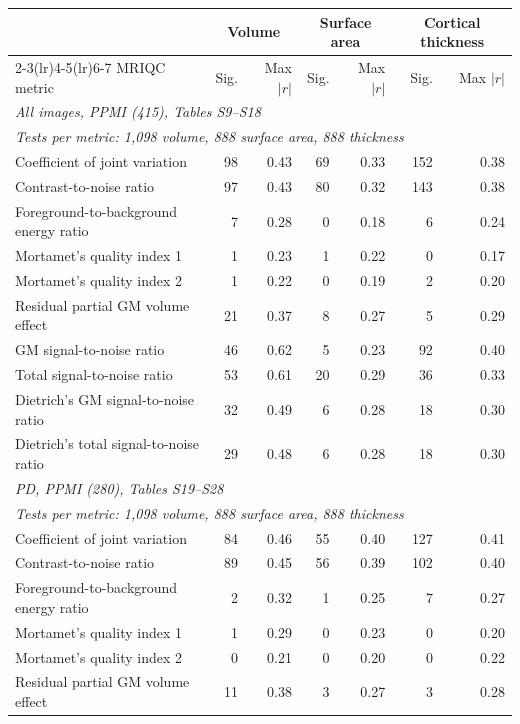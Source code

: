 \begin{tabular}{lrrrrrr}
\toprule
 & \multicolumn{2}{c}{Volume} & \multicolumn{2}{c}{Surface area} & \multicolumn{2}{c}{Cortical thickness} \\
\cmidrule(lr){2-3}\cmidrule(lr){4-5}\cmidrule(lr){6-7}
MRIQC metric & Sig. & Max $|r|$ & Sig. & Max $|r|$ & Sig. & Max $|r|$ \\
\midrule
\multicolumn{7}{l}{\textit{All images{,} PPMI (415){,} Tables S9--S18}} \\
\multicolumn{7}{l}{\textit{Tests per metric: 1{,}098 volume{,} 888 surface area{,} 888 thickness}} \\
Coefficient of joint variation & 98 & 0.43 & 69 & 0.33 & 152 & 0.38 \\
Contrast-to-noise ratio & 97 & 0.43 & 80 & 0.32 & 143 & 0.38 \\
Foreground-to-background energy ratio & 7 & 0.28 & 0 & 0.18 & 6 & 0.24 \\
Mortamet's quality index 1 & 1 & 0.23 & 1 & 0.22 & 0 & 0.17 \\
Mortamet's quality index 2 & 1 & 0.22 & 0 & 0.19 & 2 & 0.20 \\
Residual partial GM volume effect & 21 & 0.37 & 8 & 0.27 & 5 & 0.29 \\
GM signal-to-noise ratio & 46 & 0.62 & 5 & 0.23 & 92 & 0.40 \\
Total signal-to-noise ratio & 53 & 0.61 & 20 & 0.29 & 36 & 0.33 \\
Dietrich's GM signal-to-noise ratio & 32 & 0.49 & 6 & 0.28 & 18 & 0.30 \\
Dietrich's total signal-to-noise ratio & 29 & 0.48 & 6 & 0.28 & 18 & 0.30 \\
\midrule
\multicolumn{7}{l}{\textit{PD{,} PPMI (280){,} Tables S19--S28}} \\
\multicolumn{7}{l}{\textit{Tests per metric: 1{,}098 volume{,} 888 surface area{,} 888 thickness}} \\
Coefficient of joint variation & 84 & 0.46 & 55 & 0.40 & 127 & 0.41 \\
Contrast-to-noise ratio & 89 & 0.45 & 56 & 0.39 & 102 & 0.40 \\
Foreground-to-background energy ratio & 2 & 0.32 & 1 & 0.25 & 7 & 0.27 \\
Mortamet's quality index 1 & 1 & 0.29 & 0 & 0.23 & 0 & 0.20 \\
Mortamet's quality index 2 & 0 & 0.21 & 0 & 0.20 & 0 & 0.22 \\
Residual partial GM volume effect & 11 & 0.38 & 3 & 0.27 & 3 & 0.28 \\

\end{tabular}
